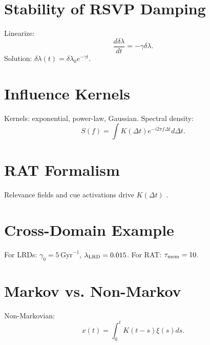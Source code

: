 \documentclass[12pt]{article}
\begin{document}
\appendix
\section{Stability of RSVP Damping}
\label{app:gamma_closure}
Linearize:
\begin{equation}
\frac{d\delta\lambda}{dt} = -\gamma \delta\lambda.
\end{equation}
Solution: $\delta\lambda(t) = \delta\lambda_0 e^{-\gamma t}$.

\section{Influence Kernels}
\label{app:autoregressive}
Kernels: exponential, power-law, Gaussian. Spectral density:
\begin{equation}
S(f) = \int K(\Delta t) e^{-i2\pi f \Delta t} d\Delta t.
\end{equation}

\section{RAT Formalism}
\label{app:rat}
Relevance fields and cue activations drive $K(\Delta t)$ \citep{Barenholtz2025}.

\section{Cross-Domain Example}
\label{app:example}
For LRDs: $\gamma_0 = 5 \, \text{Gyr}^{-1}$, $\lambda_{\rm LRD} = 0.015$. For RAT: $\tau_{\rm mem} = 10$.

\section{Markov vs. Non-Markov}
\label{app:markov}
Non-Markovian:
\begin{equation}
x(t) = \int_0^t K(t-s) \xi(s) ds.
\end{equation}



\end{document}
